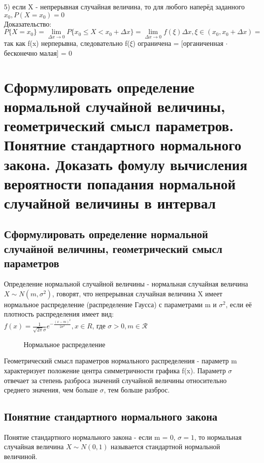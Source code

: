 5) если X - непрерывная случайная величина, то для любого наперёд заданного $x_{0}, P(X = x_{0}) = 0$\\

Доказательство:\\
$P\{X = x_{0}\} = \lim\limits_{\Delta x \rightarrow 0} P \{x_{0} \leqslant X < x_{0} + \Delta x\} = \lim\limits_{\Delta x \rightarrow 0} f(\xi) \Delta x, \xi \in (x_{0}, x_{0} + \Delta x) = $ так как f(x) нерперывна, следовательно f($\xi$) ограничена = [органиченная $\cdot$ бесконечно малая] = 0\\

\section{Сформулировать определение нормальной случайной величины, геометрический смысл параметров. Понятние стандартного нормального закона. Доказать фомулу вычисления вероятности попадания нормальной случайной величины в интервал}

\subsection{Сформулировать определение нормальной случайной величины, геометрический смысл параметров}
Определение нормальной случайной величины - нормальная случайная величина $X \sim N(m, \sigma^{2})$, говорят, что непрерывная случайная величина X имеет нормальное распределение (распределение Гаусса) с параметрами m и $\sigma^{2}$, если её плотность распределения имеет вид:\\
$f(x) = \frac{1}{\sqrt{2 \pi} \sigma} e^{-\frac{(x - m)^{2}}{2\sigma^{2}}}, x \in R$, где $\sigma > 0, m \in \mathcal{R}$\\
\begin{figure}[H]
	\caption{Нормальное распределение}
\end{figure}

Геометрический смысл параметров нормального распределения - параметр m характеризует положение центра симметричности графика f(x). Параметр $\sigma$ отвечает за степень разброса значений случайной величины относительно среднего значения, чем больше $\sigma$, тем больше разброс.

\subsection{Понятние стандартного нормального закона}
Понятие стандартного нормального закона - если m = 0, $\sigma = 1$, то нормальная случайная величина $X \sim N(0, 1)$ называется стандартной нормальной величиной.

